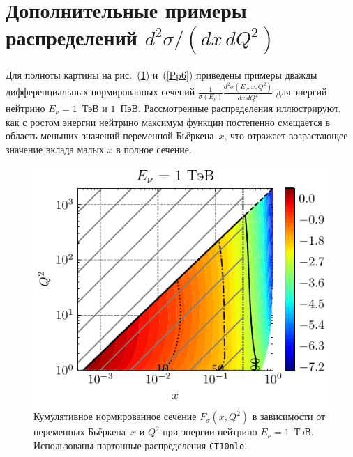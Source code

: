 \section{Дополнительные примеры распределений $d^2\sigma/(dx\,dQ^2)$}
\label{sec:examples_extrapolated_region}

Для полноты картины на рис.~(\ref{Pp3}) и~(\ref{Pp6}) приведены примеры дважды дифференциальных нормированных сечений $\frac{1}{\sigma(E_\nu)}\frac{d^2\sigma(E_\nu,x,Q^2)}{dx\,dQ^2}$ для энергий нейтрино $E_\nu = 1$~ТэВ и $1$~ПэВ. 
Рассмотренные распределения иллюстрируют, как с ростом энергии нейтрино максимум функции постепенно смещается в область меньших значений переменной Бьёркена~$x$, что отражает возрастающее значение вклада малых $x$ в полное сечение. 

\begin{figure}[!h]
\centering
\includegraphics[width=0.8\linewidth]{images/NuProp/cdfxq2_cc_proton_CT10nlo_14_1000.pdf}
\caption{Кумулятивное нормированное сечение $F_{\sigma}(x,Q^2)$ в зависимости от переменных Бьёркена~$x$ и $Q^2$ при энергии нейтрино $E_{\nu} = 1$~ТэВ. Использованы партонные распределения \texttt{CT10nlo}.}
\label{Pp3}
\end{figure}

